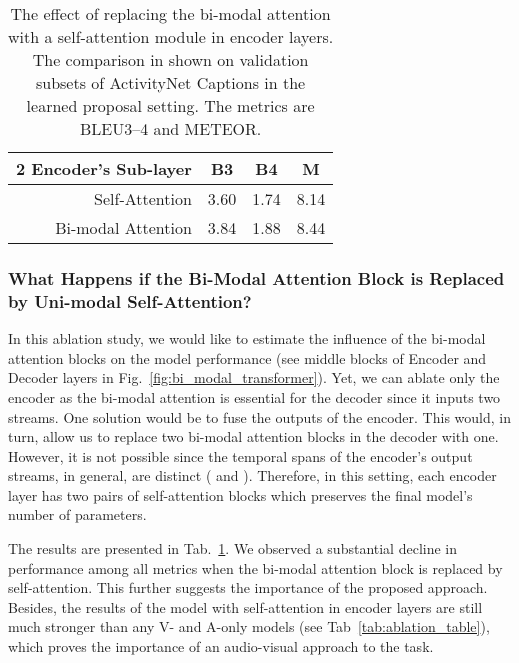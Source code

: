 \documentclass{src/bmvc2k}
\begin{document}
\begin{table}
    \begin{minipage}[c]{0.35\textwidth}
        \centering
        \setlength\tabcolsep{0.3em}
        \vspace{-1ex}\clearpage{}\begin{tabular}{rccc}
\toprule
\textbf{2 Encoder's Sub-layer} & \textbf{B3} & \textbf{B4} & \textbf{M} \\
\midrule
Self-Attention & 3.60 & 1.74 & 8.14 \\
Bi-modal Attention & 3.84 & 1.88 & 8.44\\
\bottomrule
\end{tabular}\clearpage{}
    \end{minipage}\hfill
    \begin{minipage}[c]{0.48\textwidth}
        \caption{The effect of replacing the bi-modal attention with a self-attention module in encoder layers. The comparison in shown on validation subsets of ActivityNet Captions in the learned proposal setting. The metrics are BLEU3--4 and METEOR. \label{tab:no_bi_modal_att}}
    \end{minipage}
\end{table}

\subsubsection{What Happens if the Bi-Modal Attention Block is Replaced by Uni-modal Self-Attention?\label{sec:no_bi_modal_att}}

In this ablation study, we would like to estimate the influence of the bi-modal attention blocks on the model performance (see middle blocks of Encoder and Decoder layers in Fig.~\ref{fig:bi_modal_transformer}). Yet, we can ablate only the encoder as the bi-modal attention is essential for the decoder since it inputs two streams. One solution would be to fuse the outputs of the encoder. This would, in turn, allow us to replace two bi-modal attention blocks in the decoder with one. However, it is not possible since the temporal spans of the encoder's output streams, in general, are distinct ( and ). Therefore, in this setting, each encoder layer has two pairs of self-attention blocks which preserves the final model's number of parameters.

The results are presented in Tab.~\ref{tab:no_bi_modal_att}. We observed a substantial decline in performance among all metrics when the bi-modal attention block is replaced by self-attention. This further suggests the importance of the proposed approach. Besides, the results of the model with self-attention in encoder layers are still much stronger than any V- and A-only models (see Tab~\ref{tab:ablation_table}), which proves the importance of an audio-visual approach to the task.
\end{document}
